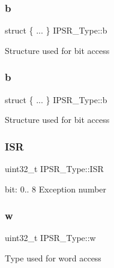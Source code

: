 \subsubsection{\texorpdfstring{b}{b}\hspace{0.1cm}{\footnotesize\ttfamily [11/12]}}
{\footnotesize\ttfamily struct \{ ... \}   I\+P\+S\+R\+\_\+\+Type\+::b}

Structure used for bit access \mbox{\label{union_i_p_s_r___type_a4bc53b7f1c45dfecfa620b65dc4bd4c7}} 
\subsubsection{\texorpdfstring{b}{b}\hspace{0.1cm}{\footnotesize\ttfamily [12/12]}}
{\footnotesize\ttfamily struct \{ ... \}   I\+P\+S\+R\+\_\+\+Type\+::b}

Structure used for bit access \mbox{\label{union_i_p_s_r___type_ab46e5f1b2f4d17cfb9aca4fffcbb2fa5}} 
\subsubsection{\texorpdfstring{ISR}{ISR}}
{\footnotesize\ttfamily uint32\+\_\+t I\+P\+S\+R\+\_\+\+Type\+::\+I\+SR}

bit\+: 0.. 8 Exception number \mbox{\label{union_i_p_s_r___type_a4adca999d3a0bc1ae682d73ea7cfa879}} 
\subsubsection{\texorpdfstring{w}{w}}
{\footnotesize\ttfamily uint32\+\_\+t I\+P\+S\+R\+\_\+\+Type\+::w}

Type used for word access 

